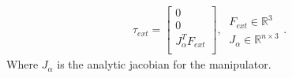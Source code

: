\documentclass[letterpaper, 10 pt, conference]{ieeeconf}  %
\begin{document}
\begin{subequations}
\begin{align}
& \tau_{ext} = \begin{bmatrix}
    0 \\
    0 \\
    J_{\alpha}^T F_{ext}\\
    \end{bmatrix}, ~\begin{matrix} F_{ext} \in \mathbb{R}^{3}\\ J_\alpha \in \mathbb{R}^{n \times 3}\end{matrix}.
\end{align}
\end{subequations}
Where $J_{\alpha}$ is the analytic jacobian for the manipulator.
\end{document}
